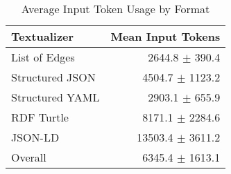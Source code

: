 \begin{table}[ht]
\centering
\caption{Average Input Token Usage by Format}
\begin{tabular}{lr}
\toprule
Textualizer & Mean Input Tokens \\
\midrule
List of Edges & 2644.8 $\pm$ 390.4 \\
Structured JSON & 4504.7 $\pm$ 1123.2 \\
Structured YAML & 2903.1 $\pm$ 655.9 \\
RDF Turtle & 8171.1 $\pm$ 2284.6 \\
JSON-LD & 13503.4 $\pm$ 3611.2 \\
\midrule
Overall & 6345.4 $\pm$ 1613.1 \\
\bottomrule
\end{tabular}
\end{table}